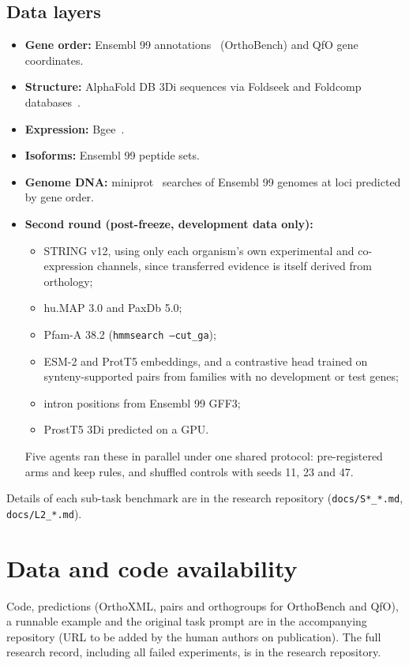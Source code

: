 \subsection*{Data layers}
\begin{itemize}
\item \textbf{Gene order:} Ensembl 99 annotations~\cite{yates2019ensembl} (OrthoBench) and QfO gene coordinates.
\item \textbf{Structure:} AlphaFold DB 3Di sequences via Foldseek and Foldcomp databases~\cite{vankempen2024foldseek,kim2023foldcomp,varadi2024alphafolddb}.
\item \textbf{Expression:} Bgee~\cite{bastian2025bgee}.
\item \textbf{Isoforms:} Ensembl 99 peptide sets.
\item \textbf{Genome DNA:} miniprot~\cite{li2023miniprot} searches of Ensembl 99 genomes at loci predicted by gene order.
\item \textbf{Second round (post-freeze, development data only):}
  \begin{itemize}
  \item STRING v12, using only each organism's own experimental and co-expression channels, since transferred evidence is itself derived from orthology;
  \item hu.MAP 3.0 and PaxDb 5.0;
  \item Pfam-A 38.2 (\texttt{hmmsearch --cut\_ga});
  \item ESM-2 and ProtT5 embeddings, and a contrastive head trained on synteny-supported pairs from families with no development or test genes;
  \item intron positions from Ensembl 99 GFF3;
  \item ProstT5 3Di predicted on a GPU.
  \end{itemize}
  Five agents ran these in parallel under one shared protocol: pre-registered arms and keep rules, and shuffled controls with seeds 11, 23 and 47.
\end{itemize}
Details of each sub-task benchmark are in the research repository (\texttt{docs/S*\_*.md}, \texttt{docs/L2\_*.md}).

\section*{Data and code availability}
Code, predictions (OrthoXML, pairs and orthogroups for OrthoBench and QfO), a runnable example and the original task prompt are in the accompanying repository (URL to be added by the human authors on publication). The full research record, including all failed experiments, is in the research repository.

